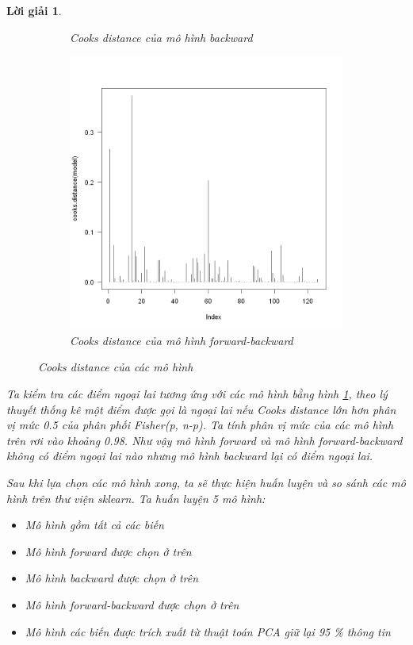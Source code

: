 \documentclass[14pt, a4paper]{article}
\theoremstyle{sltheorem}
\theoremstyle{soltheorem}
\newtheorem*{loigiai}{Lời giải}
\begin{document}
\begin{loigiai}
\begin{figure}[h!]
\begin{subfigure}[b]{0.4\textwidth}
            \caption{Cooks distance của mô hình backward}
        \end{subfigure}
        \hfill
        \begin{subfigure}[b]{0.4\textwidth}
            \centering
            \includegraphics[width=1.0\linewidth]{figures/mbo_cooks.png}
            \caption{Cooks distance của mô hình forward-backward}
        \end{subfigure}
        \caption{Cooks distance của các mô hình}
        \label{fig:Cooks}
    \end{figure}
    
    Ta kiểm tra các điểm ngoại lai tương ứng với các mô hình bằng hình \ref{fig:Cooks}, theo lý thuyết thống kê một điểm được gọi là ngoại lai nếu Cooks distance lớn hơn phân vị mức 0.5 của phân phối Fisher(p, n-p).
    Ta tính phân vị mức của các mô hình trên rơi vào khoảng 0.98.
    Như vậy mô hình forward và mô hình forward-backward không có điểm ngoại lai nào nhưng mô hình backward lại có điểm ngoại lai.

    Sau khi lựa chọn các mô hình xong, ta sẽ thực hiện huấn luyện và so sánh các mô hình trên thư viện sklearn.
    Ta huấn luyện 5 mô hình:

    \begin{itemize}
        \item Mô hình gồm tất cả các biến
        \item Mô hình forward được chọn ở trên
        \item Mô hình backward được chọn ở trên
        \item Mô hình forward-backward được chọn ở trên
        \item Mô hình các biến được trích xuất từ thuật toán PCA giữ lại 95 \% thông tin
    \end{itemize}


\end{loigiai}
\end{document}
